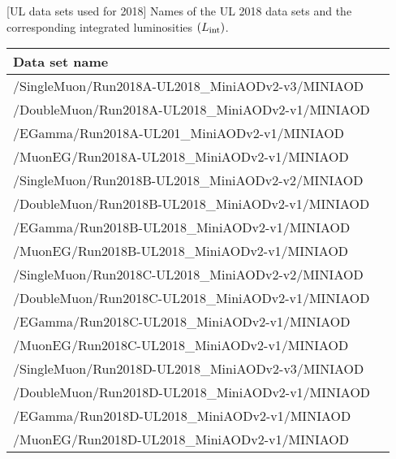 \begin{table}[h]
    \small
    \centering
    [UL data sets used for 2018] %
    {Names of the UL 2018 data sets and the corresponding integrated luminosities $\left( L_\text{int} \right)$.} %
		\begin{tabular}{lc}
		\hline      
        Data set name  \\
        \hline
		/SingleMuon/Run2018A-UL2018\_MiniAODv2-v3/MINIAOD   \\ %
		/DoubleMuon/Run2018A-UL2018\_MiniAODv2-v1/MINIAOD  \\
		/EGamma/Run2018A-UL201\_MiniAODv2-v1/MINIAOD  \\
		/MuonEG/Run2018A-UL2018\_MiniAODv2-v1/MINIAOD  \\
		\hline
		/SingleMuon/Run2018B-UL2018\_MiniAODv2-v2/MINIAOD   \\ %
		/DoubleMuon/Run2018B-UL2018\_MiniAODv2-v1/MINIAOD	  \\
		/EGamma/Run2018B-UL2018\_MiniAODv2-v1/MINIAOD		\\
		/MuonEG/Run2018B-UL2018\_MiniAODv2-v1/MINIAOD		\\
		\hline
		/SingleMuon/Run2018C-UL2018\_MiniAODv2-v2/MINIAOD   \\ %
		/DoubleMuon/Run2018C-UL2018\_MiniAODv2-v1/MINIAOD		\\
		/EGamma/Run2018C-UL2018\_MiniAODv2-v1/MINIAOD		\\
		/MuonEG/Run2018C-UL2018\_MiniAODv2-v1/MINIAOD		\\
		\hline
		/SingleMuon/Run2018D-UL2018\_MiniAODv2-v3/MINIAOD   \\ %
		/DoubleMuon/Run2018D-UL2018\_MiniAODv2-v1/MINIAOD		\\
		/EGamma/Run2018D-UL2018\_MiniAODv2-v1/MINIAOD		\\
		/MuonEG/Run2018D-UL2018\_MiniAODv2-v1/MINIAOD		\\
		\hline	
		\end{tabular}
	\label{table:2018_dataSamples_dilep}
\end{table}

